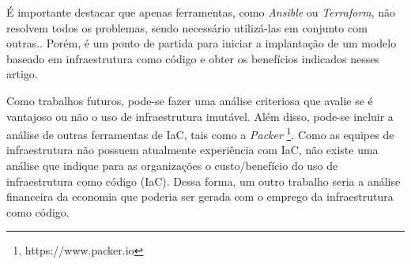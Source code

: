É importante destacar que apenas ferramentas, como \textit{Ansible} ou \textit{Terraform}, não resolvem todos os problemas, sendo necessário utilizá-las em conjunto com outras.\cite{Guerriero}. Porém, é um ponto de partida para iniciar a implantação de um modelo baseado em infraestrutura como código e obter os benefícios indicados nesses artigo.

Como trabalhos futuros, pode-se fazer uma análise criteriosa que avalie se é vantajoso ou não o uso de infraestrutura imutável. Além disso, pode-se incluir a análise de outras ferramentas de IaC, tais como a \textit{Packer} \footnote{https://www.packer.io}. 
Como as equipes de infraestrutura não possuem atualmente experiência com IaC, não existe uma análise que indique para as organizações o custo/benefício do uso de infraestrutura como código (IaC). Dessa forma, um outro trabalho seria a análise financeira da economia que poderia ser gerada com o emprego da infraestrutura como código.





